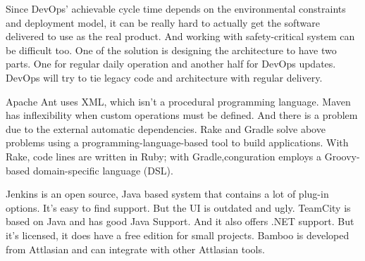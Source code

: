 \documentclass[12pt,letterpaper,boxed]{hmcpset}
\begin{document}
\begin{problem}
\end{problem}

Since DevOps' achievable cycle time depends on the environmental constraints and deployment model, it can be really hard to actually get the software delivered to use as the real product. And working with safety-critical system can be difficult too. \newline
One of the solution is designing the architecture to have two parts. One for regular daily operation and another half for DevOps updates. DevOps will try to tie legacy code and architecture with regular delivery.
\newline

\begin{problem}
\end{problem}
Apache Ant uses XML, which isn't a procedural programming language. Maven has inflexibility when custom operations must be defined. And there is a problem due to the external automatic dependencies. \newline
Rake and Gradle solve above problems using a programming-language-based tool to build applications. With Rake, code lines are written in Ruby; with Gradle,conguration employs a Groovy-based domain-specific language (DSL).


\begin{problem}
\end{problem}
Jenkins is an open source, Java based system that contains a lot of plug-in options. It's easy to find support. But the UI is outdated and ugly. \newline
TeamCity is based on Java and has good Java Support. And it also offers .NET support. But it's licensed, it does have a free edition for small projects. \newline
Bamboo is developed from Attlasian and can integrate with other Attlasian tools.
\end{document}
